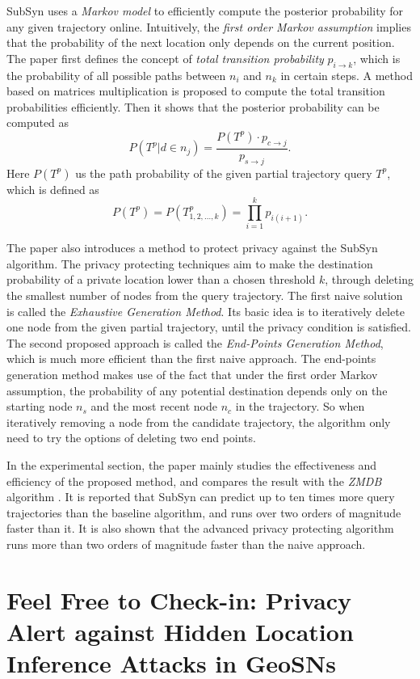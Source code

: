 \documentclass[paper=a4, fontsize=18pt]{article} %
\numberwithin{equation}{section} %
\numberwithin{figure}{section} %
\numberwithin{table}{section} %
\begin{document}
SubSyn uses a \emph{Markov model} to efficiently compute the posterior probability for any given trajectory online. Intuitively, the \emph{first order Markov assumption} implies that the probability of the next location only depends on the current position. The paper first defines the concept of \emph{total transition probability} $p_{i \rightarrow k}$, which is the probability of all possible paths between $n_i$ and $n_k$ in certain steps. A method based on matrices multiplication is proposed to compute the total transition probabilities efficiently. Then it shows that the posterior probability can be computed as
$$P(T^p | d \in n_j) = \frac{P(T^p) \cdot p_{c \rightarrow j}}{p_{s \rightarrow j}}.$$
Here $P(T^p)$ us the path probability of the given partial trajectory query $T^p$, which is defined as
$$P(T^p) = P(T_{1,2,...,k}^p) = \prod \limits^k_{i=1} p_{i(i+1)}.$$

The paper also introduces a method to protect privacy against the SubSyn algorithm. The privacy protecting techniques aim to make the destination probability of a private location lower than a chosen threshold $k$, through deleting the smallest number of nodes from the query trajectory. The first naive solution is called the \emph{Exhaustive Generation Method}. Its basic idea is to iteratively delete one node from the given partial trajectory, until the privacy condition is satisfied. The second proposed approach is called the \emph{End-Points Generation Method}, which is much more efficient than the first naive approach. The end-points generation method makes use of the fact that under the first order Markov assumption, the probability of any potential destination depends only on the starting node $n_s$ and the most recent node $n_c$ in the trajectory. So when iteratively removing a node from the candidate trajectory, the algorithm only need to try the options of deleting two end points.

In the experimental section, the paper mainly studies the effectiveness and efficiency of the proposed method, and compares the result with the \emph{ZMDB} algorithm \cite{ZMDB08}. It is reported that SubSyn can predict up to ten times more query trajectories than the baseline algorithm, and runs over two orders of magnitude faster than it. It is also shown that the advanced privacy protecting algorithm runs more than two orders of magnitude faster than the naive approach.


\section{Feel Free to Check-in: Privacy Alert against Hidden Location Inference Attacks in GeoSNs \cite{HMZ13}}
\end{document}
